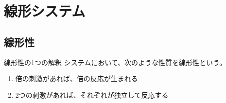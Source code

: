 \documentclass[../math-imaging]{subfiles}
\begin{document}
\chapter{線形システム}

\section{線形性}

\begin{definition}{線形性の1つの解釈}
  システムにおいて、次のような性質を線形性という。
  \begin{enumerate}
    \item 倍の刺激があれば、倍の反応が生まれる
    \item 2つの刺激があれば、それぞれが独立して反応する
  \end{enumerate}
\end{definition}
\end{document}

